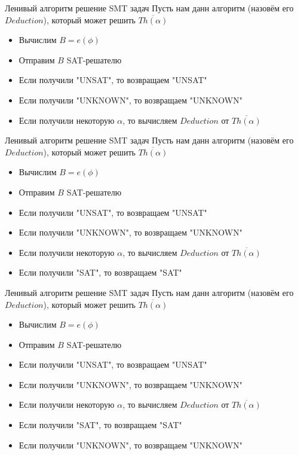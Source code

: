\documentclass{beamer}
\begin{document}
\begin{frame}{Ленивый алгоритм решение SMT задач}
Пусть нам данн алгоритм (назовём его $Deduction$), который может решить $\overline{Th(\alpha)}$
\begin{itemize}
\item Вычислим $B = e(\phi)$
\item Отправим $B$ SAT-решателю
\item Если получили "UNSAT", то возвращаем "UNSAT"
\item Если получили "UNKNOWN", то возвращаем "UNKNOWN"
\item Если получили некоторую $\alpha$, то вычисляем $Deduction$ от $\overline{Th(\alpha)}$
\end{itemize}
\end{frame}

\begin{frame}{Ленивый алгоритм решение SMT задач}
Пусть нам данн алгоритм (назовём его $Deduction$), который может решить $\overline{Th(\alpha)}$
\begin{itemize}
\item Вычислим $B = e(\phi)$
\item Отправим $B$ SAT-решателю
\item Если получили "UNSAT", то возвращаем "UNSAT"
\item Если получили "UNKNOWN", то возвращаем "UNKNOWN"
\item Если получили некоторую $\alpha$, то вычисляем $Deduction$ от $\overline{Th(\alpha)}$
\item Если получили "SAT", то возвращаем "SAT"
\end{itemize}
\end{frame}

\begin{frame}{Ленивый алгоритм решение SMT задач}
Пусть нам данн алгоритм (назовём его $Deduction$), который может решить $\overline{Th(\alpha)}$
\begin{itemize}
\item Вычислим $B = e(\phi)$
\item Отправим $B$ SAT-решателю
\item Если получили "UNSAT", то возвращаем "UNSAT"
\item Если получили "UNKNOWN", то возвращаем "UNKNOWN"
\item Если получили некоторую $\alpha$, то вычисляем $Deduction$ от $\overline{Th(\alpha)}$
\item Если получили "SAT", то возвращаем "SAT"
\item Если получили "UNKNOWN", то возвращаем "UNKNOWN"
\end{itemize}
\end{frame}
\end{document}
